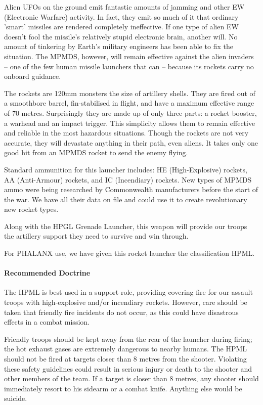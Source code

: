Alien UFOs on the ground emit fantastic amounts of jamming and other EW (Electronic Warfare) activity. In fact, they emit so much of it that ordinary 'smart' missiles are rendered completely ineffective. If one type of alien EW doesn't fool the missile's relatively stupid electronic brain, another will. No amount of tinkering by Earth's military engineers has been able to fix the situation. The MPMDS, however, will remain effective against the alien invaders -- one of the few human missile launchers that can -- because its rockets carry no onboard guidance.

The rockets are 120mm monsters the size of artillery shells. They are fired out of a smoothbore barrel, fin-stabilised in flight, and have a maximum effective range of 70 metres. Surprisingly they are made up of only three parts: a rocket booster, a warhead and an impact trigger. This simplicity allows them to remain effective and reliable in the most hazardous situations. Though the rockets are not very accurate, they will devastate anything in their path, even aliens. It takes only one good hit from an MPMDS rocket to send the enemy flying.

Standard ammunition for this launcher includes: HE (High-Explosive) rockets, AA (Anti-Armour) rockets, and IC (Incendiary) rockets. New types of MPMDS ammo were being researched by Commonwealth manufacturers before the start of the war. We have all their data on file and could use it to create revolutionary new rocket types.

Along with the HPGL Grenade Launcher, this weapon will provide our troops the artillery support they need to survive and win through.

For PHALANX use, we have given this rocket launcher the classification HPML.
\paragraph*{Recommended Doctrine}
The HPML is best used in a support role, providing covering fire for our assault troops with high-explosive and/or incendiary rockets. However, care should be taken that friendly fire incidents do not occur, as this could have disastrous effects in a combat mission.

Friendly troops should be kept away from the rear of the launcher during firing; the hot exhaust gases are extremely dangerous to nearby humans. The HPML should not be fired at targets closer than 8 metres from the shooter. Violating these safety guidelines could result in serious injury or death to the shooter and other members of the team. If a target is closer than 8 metres, any shooter should immediately resort to his sidearm or a combat knife. Anything else would be suicide.
